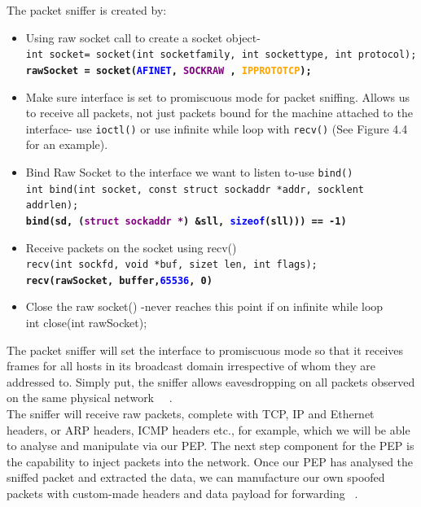 The packet sniffer is created by: 
    \begin{itemize}
        \item Using raw socket call to create a socket object- \\
        {\tt int socket= socket(int socket\textunderscore family, int socket\textunderscore type, int protocol);}\\
{\tt \textbf{rawSocket = socket(\textcolor{blue}{AF\textunderscore INET}, \textcolor{purple}{SOCK\textunderscore RAW} , \textcolor{orange}{IPPROTO\textunderscore TCP});}}
        \item Make sure interface is set to promiscuous mode for packet sniffing. Allows us to receive all packets, not just packets bound for the machine attached to the interface- use {\tt ioctl()} or use infinite while loop with {\tt recv()} (See Figure 4.4 for an example).
        
        \item Bind Raw Socket to the interface we want to listen to-use {\tt bind()}\\
{\tt int bind(int socket, const struct sockaddr *addr, socklen\textunderscore t addrlen);}\\
{\tt \textbf{bind(sd, (\textcolor{purple}{struct sockaddr *}) \&sll, \textcolor{blue}{sizeof}(sll))) == -1)}}
\item Receive packets on the socket using recv()\\
{\tt recv(int sockfd, void *buf, size\textunderscore t len, int flags);}\\
{ \tt \textbf{recv(rawSocket, buffer,\textcolor{blue}{65536}, 0)}}

        \item Close the raw socket() -never reaches this point if on infinite while loop\\
        int close(int rawSocket);\\
    \end{itemize}
    
The packet sniffer will set the interface to promiscuous mode so that it receives frames for all hosts in its broadcast domain irrespective of whom they are addressed to. Simply put, the sniffer allows eavesdropping on all packets observed on the same physical network ~\cite{35}~\cite{38}.\\

The sniffer will receive raw packets, complete with TCP, IP and Ethernet headers, or ARP headers, ICMP headers etc., for example, which we will be able to analyse and manipulate via our PEP. The next step component for the PEP is the capability to inject packets into the network. Once our PEP has analysed the sniffed packet and extracted the data, we can manufacture our own spoofed packets with custom-made headers and data payload for forwarding ~\cite{38}.\\

